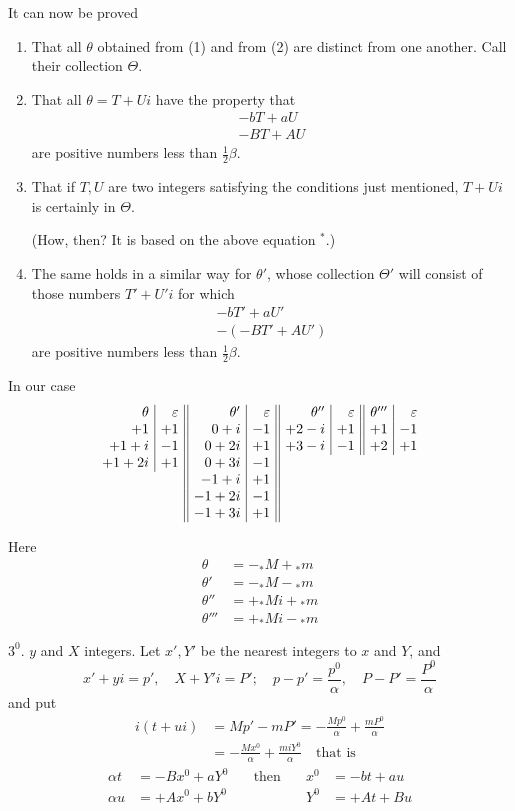 It can now be proved
\begin{enumerate}\renewcommand{\labelenumi}{\arabic{enumi})}
\item That all $\theta$ obtained from (1) and from (2) are distinct from one another. Call their collection $\Theta$.
\item That all $\theta=T+Ui$ have the property that
\[
\begin{gathered}
-bT+aU\\
-BT+AU
\end{gathered}
\]
are positive numbers less than $\frac12\beta$.
\item That if $T,U$ are two integers satisfying the conditions just mentioned, $T+Ui$ is certainly in $\Theta$.\par
(How, then? It is based on the above equation $^*$.)
\item The same holds in a similar way for $\theta'$, whose collection $\Theta'$ will consist of those numbers $T'+U'i$ for which
\[
\begin{gathered}
-bT'+aU'\\
-(-BT'+AU')
\end{gathered}
\]
are positive numbers less than $\frac12\beta$.
\end{enumerate}

In our case
\[
\setlength{\arraycolsep}{4pt}
\begin{array}{r|r||r|r||r|r||r|r}
\theta&\varepsilon&\theta'&\varepsilon&\theta''&\varepsilon&\theta'''&\varepsilon\\
+1&+1&0+i&-1&+2-i&+1&+1&-1\\
+1+i&-1&0+2i&+1&+3-i&-1&+2&+1\\
+1+2i&+1&0+3i&-1&\multicolumn{4}{c}{}\\
\multicolumn{2}{c||}{}&-1+i&+1&\multicolumn{4}{c}{}\\
\multicolumn{2}{c||}{}&-1+2i&-1&\multicolumn{4}{c}{}\\
\multicolumn{2}{c||}{}&-1+3i&+1&\multicolumn{4}{c}{}
\end{array}
\]

Here
\[
\begin{aligned}
\theta&=-{}_*M+{}_*m\\
\theta'&=-{}_*M-{}_*m\\
\theta''&=+{}_*Mi+{}_*m\\
\theta'''&=+{}_*Mi-{}_*m
\end{aligned}
\]

$3^0$. $y$ and $X$ integers. Let $x',Y'$ be the nearest integers to $x$ and $Y$, and
\[
x'+yi=p',\quad X+Y'i=P';\quad p-p'=\frac{p^0}{\alpha},\quad P-P'=\frac{P^0}{\alpha}
\]
and put
\[
\begin{aligned}
i(t+ui)&=Mp'-mP'=-\frac{Mp^0}{\alpha}+\frac{mP^0}{\alpha}\\
&=-\frac{Mx^0}{\alpha}+\frac{miY^0}{\alpha}\quad\text{that is}
\end{aligned}
\]
\[
\begin{alignedat}{3}
\alpha t&=-Bx^0+aY^0\quad&\text{then}\quad&x^0&=-bt+au\\
\alpha u&=+Ax^0+bY^0&&Y^0&=+At+Bu
\end{alignedat}
\]

